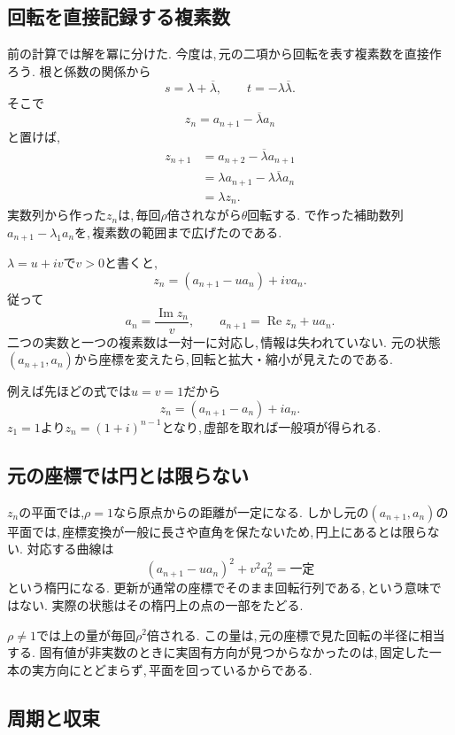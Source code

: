 \subsection{回転を直接記録する複素数}\label{節：回転を直接記録する複素数}

前の計算では解を冪に分けた.
今度は,\,元の二項から回転を表す複素数を直接作ろう.
根と係数の関係から
\[
 s=\lambda+\overline\lambda,\qquad
 t=-\lambda\overline\lambda.
\]
そこで
\[
 z_n=a_{n+1}-\overline\lambda a_n
\]
と置けば,
\[
 \begin{aligned}
 z_{n+1}
 &=a_{n+2}-\overline\lambda a_{n+1}\\
 &=\lambda a_{n+1}-\lambda\overline\lambda a_n\\
 &=\lambda z_n.
 \end{aligned}
\]
実数列から作った$z_n$は,\,毎回$\rho$倍されながら$\theta$回転する.
で作った補助数列$a_{n+1}-\lambda_1a_n$を,\,複素数の範囲まで広げたのである.

$\lambda=u+iv$で$v>0$と書くと,
\[
 z_n=(a_{n+1}-ua_n)+iv a_n.
\]
従って
\[
 a_n=\frac{\operatorname{Im}z_n}{v},\qquad
 a_{n+1}=\operatorname{Re}z_n+u a_n.
\]
二つの実数と一つの複素数は一対一に対応し,\,情報は失われていない.
元の状態$(a_{n+1},a_n)$から座標を変えたら,\,回転と拡大・縮小が見えたのである.

例えば先ほどの式では$u=v=1$だから
\[
 z_n=(a_{n+1}-a_n)+ia_n.
\]
$z_1=1$より$z_n=(1+i)^{n-1}$となり,\,虚部を取れば一般項が得られる.
\NewFigSpiral

\subsection{元の座標では円とは限らない}

$z_n$の平面では,$\rho=1$なら原点からの距離が一定になる.
しかし元の$(a_{n+1},a_n)$の平面では,\,座標変換が一般に長さや直角を保たないため,\,円上にあるとは限らない.
対応する曲線は
\[
 (a_{n+1}-ua_n)^2+v^2a_n^2=\text{一定}
\]
という楕円になる.
更新が通常の座標でそのまま回転行列である,\,という意味ではない.
実際の状態はその楕円上の点の一部をたどる.

$\rho\ne1$では上の量が毎回$\rho^2$倍される.
この量は,\,元の座標で見た回転の半径に相当する.
固有値が非実数のときに実固有方向が見つからなかったのは,\,固定した一本の実方向にとどまらず,\,平面を回っているからである.

\subsection{周期と収束}

